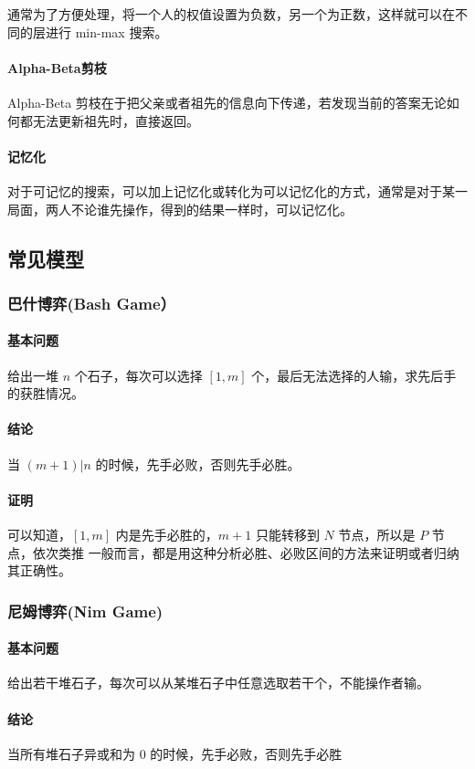 \documentclass[UTF-8]{ctexart}
\begin{document}
		通常为了方便处理，将一个人的权值设置为负数，另一个为正数，这样就可以在不同的层进行 min-max 搜索。
		\paragraph{Alpha-Beta剪枝} Alpha-Beta 剪枝在于把父亲或者祖先的信息向下传递，若发现当前的答案无论如何都无法更新祖先时，直接返回。
		\paragraph{记忆化}对于可记忆的搜索，可以加上记忆化或转化为可以记忆化的方式，通常是对于某一局面，两人不论谁先操作，得到的结果一样时，可以记忆化。
		\subsection{常见模型}
			\subsubsection{巴什博弈(Bash Game）}
			\paragraph{基本问题} 给出一堆 $n$ 个石子，每次可以选择 $[1,m]$ 个，最后无法选择的人输，求先后手的获胜情况。
			\paragraph{结论} 当 $(m+1)|n$ 的时候，先手必败，否则先手必胜。
			\paragraph{证明} 可以知道，$[1,m]$ 内是先手必胜的，$m+1$ 只能转移到 $N$ 节点，所以是 $P$ 节点，依次类推
			一般而言，都是用这种分析必胜、必败区间的方法来证明或者归纳其正确性。
			\subsubsection{尼姆博弈(Nim Game)}
			\paragraph{基本问题} 给出若干堆石子，每次可以从某堆石子中任意选取若干个，不能操作者输。
			\paragraph{结论} 当所有堆石子异或和为 $0$ 的时候，先手必败，否则先手必胜
\end{document}
